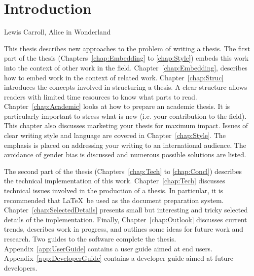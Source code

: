 %
%
% 
% 
% 

\chapter{Introduction}


{
Lewis Carroll, Alice in Wonderland
}



This thesis describes new approaches to the problem of writing a
thesis.
%
The first part of the thesis (Chapters~\ref{chap:Embedding} to
\ref{chap:Style}) embeds this work into the context of other work in
the field. Chapter~\ref{chap:Embedding}, describes how to embed work
in the context of related work.
%
Chapter~\ref{chap:Struc} introduces the concepts
involved in structuring a thesis. A clear structure allows readers
with limited time resources to know what parts to read.
%
Chapter~\ref{chap:Academic} looks at how to prepare an academic
thesis. It is particularly important to stress what is new (i.e. your
contribution to the field). This chapter also discusses marketing your
thesis for maximum impact.
%
Issues of clear writing style and language are covered in
Chapter~\ref{chap:Style}. The emphasis is placed on addressing your
writing to an international audience. The avoidance of gender bias is
discussed and numerous possible solutions are listed.


The second part of the thesis (Chapters~\ref{chap:Tech} to
\ref{chap:Concl}) describes the technical implementation
of this work.
%
Chapter~\ref{chap:Tech} discusses technical issues involved in the
production of a thesis. In particular, it is recommended that
\LaTeX\ be used as the document preparation system.
%
Chapter~\ref{chap:SelectedDetails} presents small but interesting
and tricky selected details of the implementation.
%
Finally, Chapter~\ref{chap:Outlook} discusses current trends,
describes work in progress, and outlines some ideas for future
work and research.
%
Two guides to the software complete the thesis.
Appendix~\ref{app:UserGuide} contains a user guide aimed at end users.
Appendix~\ref{app:DeveloperGuide} contains a developer guide
aimed at future developers.


